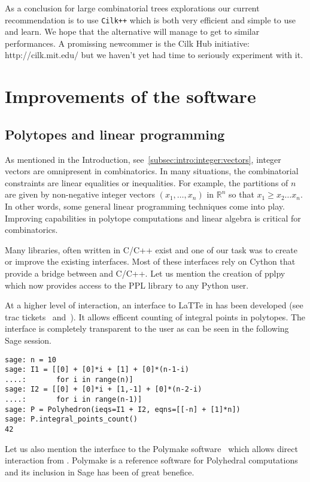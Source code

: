 \documentclass{deliverablereport}
\newcommand{\CilkP}{\texttt{Cilk++}\xspace}
\begin{document}
As a conclusion for large combinatorial trees explorations our current
recommendation is to use \CilkP which is both very efficient and simple to use
and learn. We hope that the alternative will manage to get to similar
performances. A promissing newcommer is the Cilk Hub initiative:
http://cilk.mit.edu/ but we haven't yet had time to seriously experiment with
it.




\section{Improvements of the \Sage software}


\subsection{Polytopes and linear programming}
\label{subsec:polytopes}

As mentioned in the Introduction, see~\ref{subsec:intro:integer:vectors},
integer vectors are omnipresent in combinatorics. In many situations,
the combinatorial constraints are linear equalities or inequalities.
For example, the partitions of $n$ are given by non-negative integer
vectors $(x_1, \ldots, x_n)$ in $\mathbb{R}^n$ so that $x_1 \geq x_2 \ldots x_n$.
In other words, some general linear programming techniques come into
play. Improving \Sage capabilities in polytope computations and linear algebra
is critical for combinatorics.

Many libraries, often written in C/C++ exist and one of our task was to
create or improve the existing \Sage interfaces. Most of these interfaces
rely on Cython that provide a bridge between \Python and C/C++. Let
us mention the creation of pplpy~\cite{pplpy-code} which now provides
access to the PPL library to any Python user.

At a higher level of interaction, an interface to LaTTe in \Sage has
been developed (see trac tickets~\cite{trac-18211}
and~\cite{trac-22497}). It allows efficent counting of
integral points in polytopes. The interface is completely transparent to the
user as can be seen in the following Sage session.
\begin{verbatim}
sage: n = 10
sage: I1 = [[0] + [0]*i + [1] + [0]*(n-1-i)
....:       for i in range(n)]
sage: I2 = [[0] + [0]*i + [1,-1] + [0]*(n-2-i)
....:       for i in range(n-1)]
sage: P = Polyhedron(ieqs=I1 + I2, eqns=[[-n] + [1]*n])
sage: P.integral_points_count()
42
\end{verbatim}
Let us also mention the \Sage interface to the Polymake
software~\cite{polymake-code} which allows direct interaction from
\Sage. Polymake is a reference software for Polyhedral computations
and its inclusion in Sage has been of great benefice.
\end{document}
